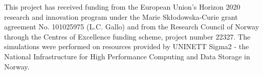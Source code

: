 \documentclass{article} %
\begin{document}
This project has received funding from the European Union’s Horizon 2020 research and innovation program under the Marie Skłodowska-Curie grant agreement No. 101025975 (L.C. Gallo) and from the Research Council of Norway through the Centres of Excellence funding scheme, project number 22327. The simulations were performed on resources provided by UNINETT Sigma2 - the National Infrastructure for High Performance Computing and Data Storage in Norway.




%



\end{document}
